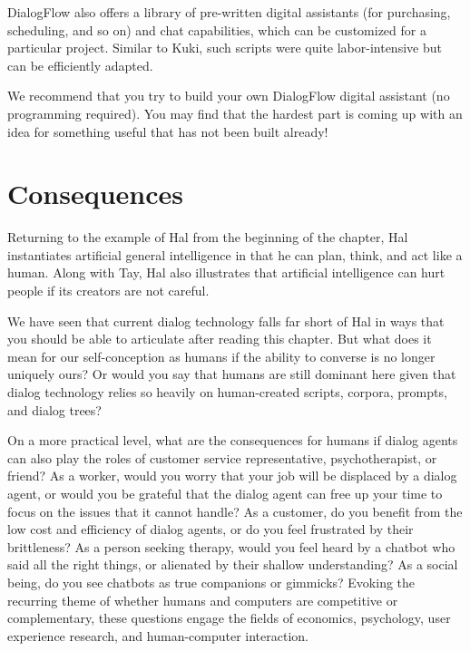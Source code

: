 DialogFlow also offers a library of pre-written digital assistants (for purchasing, scheduling, and so on) and chat capabilities, which can be customized for a particular project. Similar to Kuki, such scripts were quite labor-intensive but can be efficiently adapted.

We recommend that you try to build your own DialogFlow digital assistant  (no programming required).  You may find that the hardest part is coming up with an idea for something useful that has not been built already!

\section{Consequences}
\largerpage
Returning to the example of Hal from the beginning of the chapter, Hal instantiates  artificial general intelligence in that he can plan, think, and act like a human.  Along with Tay, Hal also illustrates that artificial intelligence can hurt people if its creators are not careful.


We have seen that current dialog technology falls far short of Hal in ways that you should be able to articulate  after reading this chapter.  But what does it mean for our self-conception as humans if the ability to converse is no longer uniquely ours?  Or would you say that humans are still dominant here given that dialog technology relies so heavily on human-created scripts, corpora, prompts, and dialog trees?

On a more practical level, what are the consequences for humans if dialog agents can also play the roles of customer service representative, psychotherapist, or friend?  As a worker, would you worry that your job will be displaced by a dialog agent, or would you be grateful that the dialog agent can free up your time to focus on the issues that it cannot handle?  As a customer, do you benefit from the low cost and efficiency of dialog agents, or do you feel frustrated by their brittleness?  As a person seeking therapy, would you feel heard by a chatbot who said all the right things, or alienated by their shallow understanding?  As a social being, do you see chatbots as true companions or gimmicks?  Evoking the recurring theme of whether humans and computers are competitive or complementary, these questions engage the fields of economics, psychology, user experience research, and human-computer interaction.











